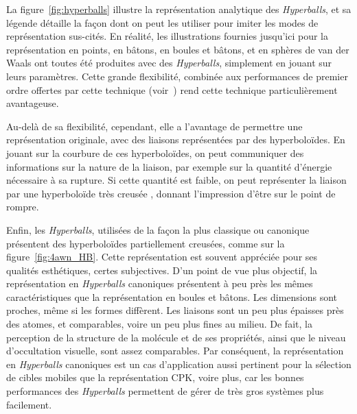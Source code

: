 	La figure~\ref{fig:hyperballs} illustre la représentation analytique des \emph{Hyperballs}, et sa légende détaille la façon dont on peut les utiliser pour \og imiter \fg{} les modes de représentation sus-cités. En réalité, les illustrations fournies jusqu'ici pour la représentation en points, en bâtons, en boules et bâtons, et en sphères de van der Waals ont toutes été produites avec des \emph{Hyperballs}, simplement en jouant sur leurs paramètres. Cette grande flexibilité, combinée aux performances de premier ordre offertes par cette technique (voir~\cite{chavent2011gpu}) rend cette technique particulièrement avantageuse.
		
	Au-delà de sa flexibilité, cependant, elle a l'avantage de permettre une représentation originale, avec des liaisons représentées par des hyperboloïdes. En jouant sur la courbure de ces hyperboloïdes, on peut communiquer des informations sur la nature de la liaison, par exemple sur la quantité d'énergie nécessaire à sa rupture. Si cette quantité est faible, on peut représenter la liaison par une hyperboloïde très \og creusée \fg{}, donnant l'impression d'être sur le point de rompre.
		
	Enfin, les \emph{Hyperballs}, utilisées de la façon la plus \og classique \fg{} ou \og canonique \fg{} présentent des hyperboloïdes partiellement creusées, comme sur la figure~\ref{fig:4awn_HB}. Cette représentation est souvent appréciée pour ses qualités esthétiques, certes subjectives. D'un point de vue plus objectif, la représentation en \emph{Hyperballs} canoniques présentent à peu près les mêmes caractéristiques que la représentation en boules et bâtons. Les dimensions sont proches, même si les formes diffèrent. Les liaisons sont un peu plus épaisses près des atomes, et comparables, voire un peu plus fines au milieu. De fait, la perception de la structure de la molécule et de ses propriétés, ainsi que le niveau d'occultation visuelle, sont assez comparables. Par conséquent, la représentation en \emph{Hyperballs} canoniques est un cas d'application aussi pertinent pour la sélection de cibles mobiles que la représentation CPK, voire plus, car les bonnes performances des \emph{Hyperballs} permettent de gérer de très gros systèmes plus facilement.
		
